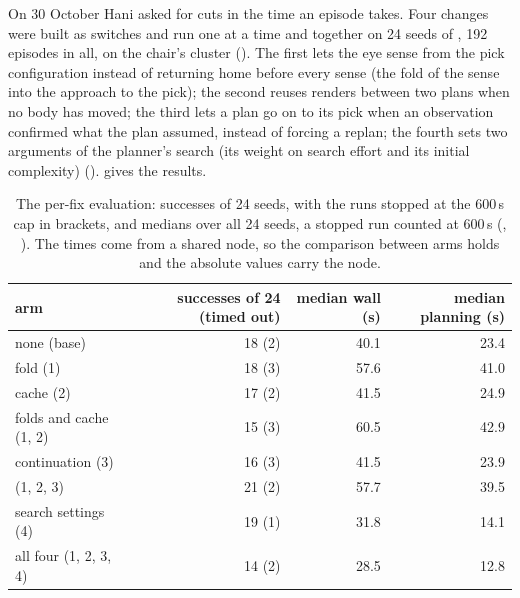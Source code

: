 On 30 October Hani asked for cuts in the time an episode takes. Four changes were
built as switches and run one at a time and together on 24 seeds of \fdice, 192
episodes in all, on the chair's cluster (). The first lets the eye sense
from the pick configuration instead of returning home before every sense (the
fold of the sense into the approach to the pick); the second reuses renders
between two plans when no body has moved; the third lets a plan go on to its pick
when an observation confirmed what the plan assumed, instead of forcing a replan;
the fourth sets two arguments of the planner's search (its weight on search effort
and its initial complexity) ().  gives the results.

\begin{table}[tbp]
\centering
\small
\begin{tabular}{lrrr}
\toprule
arm & successes of 24 (timed out) & median wall (s) & median planning (s) \\
\midrule
none (base)                       & 18 (2) & 40.1 & 23.4 \\
fold (1)                          & 18 (3) & 57.6 & 41.0 \\
cache (2)                         & 17 (2) & 41.5 & 24.9 \\
folds and cache (1, 2)            & 15 (3) & 60.5 & 42.9 \\
continuation (3)                  & 16 (3) & 41.5 & 23.9 \\
(1, 2, 3)                         & 21 (2) & 57.7 & 39.5 \\
search settings (4)               & 19 (1) & 31.8 & 14.1 \\
all four (1, 2, 3, 4)             & 14 (2) & 28.5 & 12.8 \\
\bottomrule
\end{tabular}
\caption[The per-fix evaluation: successes of 24 seeds and median times.]{The
per-fix evaluation: successes of 24 seeds, with the runs stopped at the 600\,s cap in brackets,
and medians over all 24 seeds, a stopped run counted at 600\,s (, ). The times come from a shared node,
so the comparison between arms holds and the absolute values carry the node.}
\label{tab:timecuts}
\end{table}

